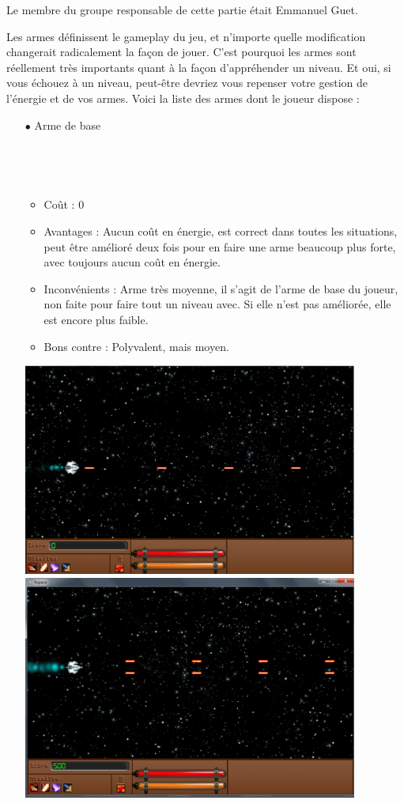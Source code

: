 \par Le membre du groupe responsable de cette partie était Emmanuel Guet.
\par Les armes définissent le gameplay du jeu, et n'importe quelle modification changerait radicalement la façon de jouer. C'est pourquoi les armes sont réellement très importants quant à la façon d'appréhender un niveau. Et oui, si vous échouez à un niveau, peut-être devriez vous repenser votre gestion de l'énergie et de vos armes. Voici la liste des armes dont le joueur dispose :


\begin{itemize}

\item[$\bullet$ Arme de base]
	\par~	
	\vspace{0.5cm}
	\par~
	\begin{itemize}
		\item Coût : 0
		\item Avantages : Aucun coût en énergie, est correct dans toutes les situations, peut être amélioré deux fois pour en faire une arme beaucoup plus forte, avec toujours aucun coût en énergie.
		\item Inconvénients : Arme très moyenne, il s'agit de l'arme de base du joueur, non faite pour faire tout un niveau avec. Si elle n'est pas améliorée, elle est encore plus faible.
		\item Bons contre : Polyvalent, mais moyen.
	\end{itemize}
	\includegraphics[width=11cm]{images/armes/base_1.png}
	\includegraphics[width=11cm]{images/armes/base_2.png}

\end{itemize}
